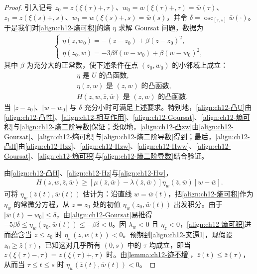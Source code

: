 \documentclass[../../main.tex]{subfiles}
\begin{document}
\begin{proof}
引入记号 $z_0=z(\xi(\tau)+,\tau)$、$w_0=w(\xi(\tau)+,\tau)=\bar w(\tau)$、$z_1=z(\xi(s)+,s)$、$w_1=w(\xi(s)+,s)=\bar w(s)$，并令 $\delta=\operatorname{osc}_{[\tau,s]}\bar w(\cdot)$。于是我们对\eqref{align:ch12-熵可积}的熵 $\eta$ 求解 Goursat 问题，数据为
\begin{align}
\begin{cases}
\eta(z,w_0)=-(z-z_0)+\beta(z-z_0)^2,\\
\eta(z_0,w)=-3\beta\delta(w-w_0)+\beta(w-w_0)^2,
\end{cases}
\label{align:ch12-Goursat}
\end{align}
其中 $\beta$ 为充分大的正常数，使下述条件在点 $(z_0,w_0)$ 的小邻域上成立：
\begin{align}
&\eta\text{ 是 }U\text{ 的凸函数},
\label{align:ch12-凸U}\\
&\eta(z,w)\text{ 是 }(z,w)\text{ 的凸函数},
\label{align:ch12-凸zw}\\
&H(z,w,\bar z,\bar w)\text{ 是 }(z,w)\text{ 的凸函数}.
\label{align:ch12-凸H}
\end{align}
当 $|z-z_0|$、$|w-w_0|$ 与 $\delta$ 充分小时可满足上述要求。特别地，\eqref{align:ch12-凸U}由\eqref{align:ch12-凸性}、\eqref{align:ch12-相互作用}、\eqref{align:ch12-Goursat}、\eqref{align:ch12-熵可积}与\eqref{align:ch12-熵二阶导数}保证；类似地，\eqref{align:ch12-凸zw}由\eqref{align:ch12-Goursat}、\eqref{align:ch12-熵可积}与\eqref{align:ch12-熵二阶导数}得到；最后，\eqref{align:ch12-凸H}由\eqref{align:ch12-Hzz}、\eqref{align:ch12-Hzw}、\eqref{align:ch12-Hww}、\eqref{align:ch12-Goursat}、\eqref{align:ch12-熵可积}与\eqref{align:ch12-熵二阶导数}结合验证。

由\eqref{align:ch12-凸H}、\eqref{align:ch12-Hz}与\eqref{align:ch12-Hw}，
\begin{align}
H(z,w,\bar z,\bar w)\geqslant[\mu(\bar z,\bar w)-\lambda(\bar z,\bar w)]\eta_w(\bar z,\bar w)[w-\bar w].
\label{align:ch12-H下界}
\end{align}
可将 $\eta_w(\bar z(t),\bar w(t))$ 估计为：沿直线 $w=\bar w(t)$，把\eqref{align:ch12-熵可积}作为 $\eta_w$ 的常微分方程，从 $z=z_0$ 处的初值 $\eta_w(z_0,\bar w(t))$ 出发积分。由于 $|\bar w(t)-w_0|\leqslant\delta$，由\eqref{align:ch12-Goursat}易推得 $-5\beta\delta\leqslant\eta_w(z_0,\bar w(t))\leqslant-\beta\delta<0$。因 $\lambda_w<0$ 且 $\eta_z<0$，\eqref{align:ch12-熵可积}进而蕴含当 $z\leqslant z_0$ 时 $\eta_w(z,\bar w(t))<0$。预期到\eqref{align:ch12-夹逼1}，现假设 $z_0\geqslant\bar z(\tau)$，已知这对几乎所有 $(0,s)$ 中的 $\tau$ 均成立，即当 $z(\xi(\tau)-,\tau)=z(\xi(\tau)+,\tau)$ 时。由\cref{lemma:ch12-迹不增}，$\bar z(t)\leqslant\bar z(\tau)$，从而当 $\tau\leqslant t\leqslant s$ 时 $\eta_w(\bar z(t),\bar w(t))<0$。


\end{proof}
\end{document}
